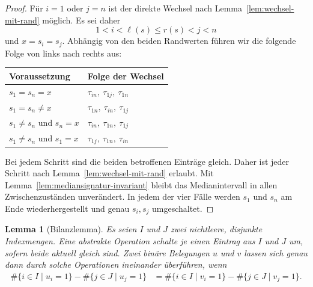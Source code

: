 \documentclass[12pt]{article}
\newtheorem{lem}[thm]{Lemma}
\begin{document}
\begin{proof}
Für $i=1$ oder $j=n$ ist der direkte Wechsel nach
Lemma~\ref{lem:wechsel-mit-rand} möglich. Es sei daher
\[
1<i<\ell(s)\leq r(s)<j<n
\]
und $x=s_i=s_j$. Abhängig von den beiden Randwerten führen wir die folgende
Folge von links nach rechts aus:
\begin{center}
\begin{tabularx}{\textwidth}{@{}>{\raggedright\arraybackslash}X
                                  >{\raggedright\arraybackslash}X@{}}
\toprule
Voraussetzung & Folge der Wechsel \\
\midrule
$s_1=s_n=x$
  & $\tau_{in},\ \tau_{1j},\ \tau_{1n}$ \\
$s_1=s_n\neq x$
  & $\tau_{1n},\ \tau_{in},\ \tau_{1j}$ \\
$s_1\neq s_n$ und $s_n=x$
  & $\tau_{in},\ \tau_{1n},\ \tau_{1j}$ \\
$s_1\neq s_n$ und $s_1=x$
  & $\tau_{1j},\ \tau_{1n},\ \tau_{in}$ \\
\bottomrule
\end{tabularx}
\end{center}
Bei jedem Schritt sind die beiden betroffenen Einträge gleich. Daher ist
jeder Schritt nach Lemma~\ref{lem:wechsel-mit-rand} erlaubt. Mit
Lemma~\ref{lem:mediansignatur-invariant} bleibt das Medianintervall in allen
Zwischenzuständen unverändert. In jedem der vier Fälle werden $s_1$ und $s_n$
am Ende wiederhergestellt und genau $s_i,s_j$ umgeschaltet.
\end{proof}

\begin{lem}[Bilanzlemma]
Es seien $I$ und $J$ zwei nichtleere, disjunkte Indexmengen. Eine abstrakte
Operation schalte je einen Eintrag aus $I$ und $J$ um, sofern beide aktuell
gleich sind. Zwei binäre Belegungen $u$ und $v$ lassen sich genau dann durch
solche Operationen ineinander überführen, wenn
\begin{align}
\#\{i\in I\mid u_i=1\}-\#\{j\in J\mid u_j=1\}
&=
\#\{i\in I\mid v_i=1\}-\#\{j\in J\mid v_j=1\}.
\label{eq:bilanz-original-notation}
\end{align}
\label{lem:binaere-bilanz-original}
\end{lem}
\end{document}
